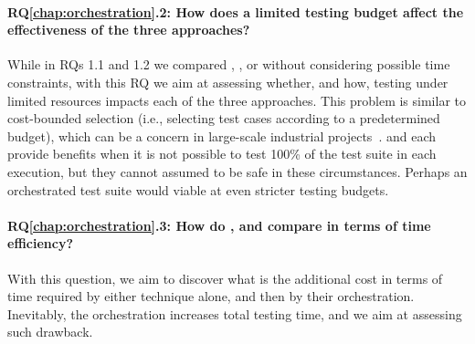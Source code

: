 \paragraph{RQ\ref{chap:orchestration}.2: How does a limited testing budget affect the effectiveness of the three approaches?}
While in RQs 1.1 and 1.2 we compared \ek, \fs, or \fz without considering possible time constraints, with this RQ we aim at assessing whether, and how, testing under limited resources impacts each of the three approaches. 
This problem is similar to cost-bounded selection \cite{cibulski2011regression} (i.e., selecting
test cases according to a predetermined budget), which can be a concern in large-scale industrial projects~\cite{elbaum2014techniques}. 
\tcs and \tcp each provide benefits when it is not possible to test 100\% of the test suite in each execution, but they cannot assumed to be safe in these circumstances.
Perhaps an orchestrated test suite would viable at even stricter testing budgets.

\paragraph{RQ\ref{chap:orchestration}.3: How do \ek, \fs and \fz compare in terms of time efficiency?}
With this question, we aim to discover what is the additional cost in terms of time required by either technique alone, and then by their orchestration.
Inevitably, the orchestration increases total testing time, and we aim at assessing such drawback.
